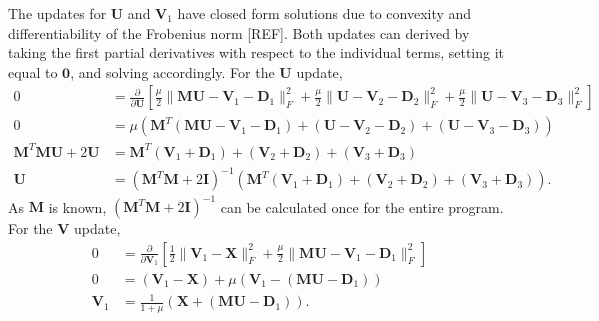 The updates for $\mathbf{U}$ and $\mathbf{V}_1$ have closed form solutions due to convexity and differentiability of the Frobenius norm [REF]. Both updates can derived by taking the first partial derivatives with respect to the individual terms, setting it equal to $\mathbf{0}$, and solving accordingly. For the $\mathbf{U}$ update,
$$
  \begin{aligned}
    0 &= \frac{\partial}{\partial \mathbf{U}}\left[\frac{\mu}{2} \|\mathbf{MU} - \mathbf{V}_1 - \mathbf{D}_1\|_F^2  + \frac{\mu}{2} \|\mathbf{U} - \mathbf{V}_2 - \mathbf{D}_2\|_F^2  + \frac{\mu}{2} \|\mathbf{U} - \mathbf{V}_3 - \mathbf{D}_3\|_F^2\right]
    \\
    0 &= \mu \left(\mathbf{M}^T(\mathbf{MU}-\mathbf{V}_1-\mathbf{D}_1) + (\mathbf{U}-\mathbf{V}_2-\mathbf{D}_2) + (\mathbf{U}-\mathbf{V}_3-\mathbf{D}_3)\right)
    \\
    \mathbf{M}^T\mathbf{MU} + 2\mathbf{U} &= \mathbf{M}^T(\mathbf{V}_1+\mathbf{D}_1) + (\mathbf{V}_2+\mathbf{D}_2) + (\mathbf{V}_3+\mathbf{D}_3)
    \\
    \mathbf{U} &= (\mathbf{M}^T \mathbf{M} + 2\mathbf{I})^{-1}(\mathbf{M}^T(\mathbf{V}_1+\mathbf{D}_1) + (\mathbf{V}_2+\mathbf{D}_2) + (\mathbf{V}_3+\mathbf{D}_3)).
  \end{aligned}
$$
As $\mathbf{M}$ is known, $(\mathbf{M}^T \mathbf{M} + 2\mathbf{I})^{-1}$ can be calculated once for the entire program. For the $\mathbf{V}$ update,
$$
\begin{aligned}
  0 &= \frac{\partial}{\partial \mathbf{V}_1} \left[ \frac{1}{2}\|\mathbf{V}_1-\mathbf{X}\|_F^2 + \frac{\mu}{2} \|\mathbf{MU} - \mathbf{V}_1 - \mathbf{D}_1 \|_F^2 \right]
  \\
  0 &= (\mathbf{V}_1 - \mathbf{X}) + \mu(\mathbf{V}_1 - (\mathbf{MU} - \mathbf{D}_1))
  \\
  \mathbf{V}_1 &= \frac{1}{1+\mu} \left(\mathbf{X} + (\mathbf{MU} - \mathbf{D}_1)\right).
\end{aligned}
$$

